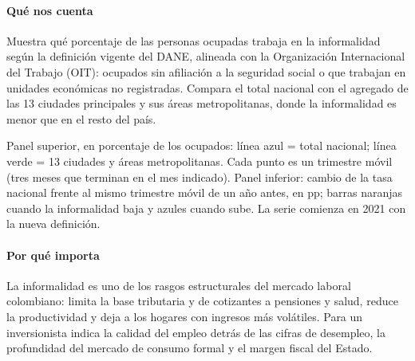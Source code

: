 \paragraph{Qué nos cuenta}
Muestra qué porcentaje de las personas ocupadas trabaja en la informalidad según la definición vigente del DANE, alineada con la Organización Internacional del Trabajo (OIT): ocupados sin afiliación a la seguridad social o que trabajan en unidades económicas no registradas. Compara el total nacional con el agregado de las 13 ciudades principales y sus áreas metropolitanas, donde la informalidad es menor que en el resto del país.

\begin{leer}
Panel superior, en porcentaje de los ocupados: línea azul = total nacional; línea verde = 13 ciudades y áreas metropolitanas. Cada punto es un trimestre móvil (tres meses que terminan en el mes indicado). Panel inferior: cambio de la tasa nacional frente al mismo trimestre móvil de un año antes, en pp; barras naranjas cuando la informalidad baja y azules cuando sube. La serie comienza en 2021 con la nueva definición.
\end{leer}

\paragraph{Por qué importa}
La informalidad es uno de los rasgos estructurales del mercado laboral colombiano: limita la base tributaria y de cotizantes a pensiones y salud, reduce la productividad y deja a los hogares con ingresos más volátiles. Para un inversionista indica la calidad del empleo detrás de las cifras de desempleo, la profundidad del mercado de consumo formal y el margen fiscal del Estado.

